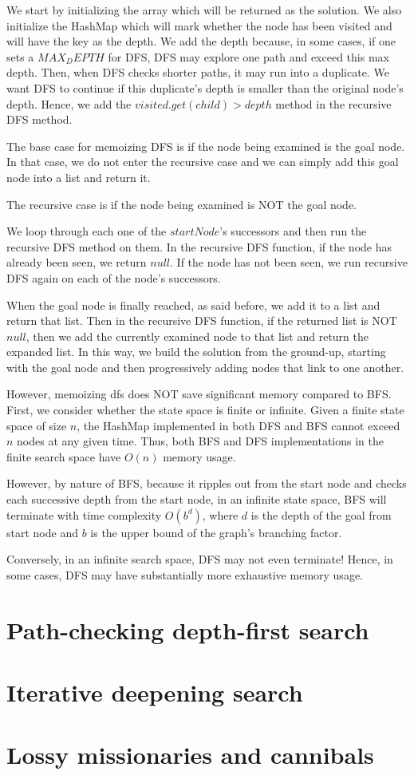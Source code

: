 \documentclass[a4paper]{report}
\begin{document}
We start by initializing the array which will be returned as the solution. We also initialize the HashMap which will
mark whether the node has been visited and will have the key as the depth. We add the depth because, in some cases, 
if one sets a $MAX_DEPTH$ for DFS, DFS may explore one path and exceed this max depth. Then, when DFS checks shorter
paths, it may run into a duplicate. We want DFS to continue if this duplicate's depth is smaller than the original node's
depth. Hence, we add the $visited.get(child) > depth$ method in the recursive DFS method.

The base case for memoizing DFS is if the node being examined is the goal node. In that case, we do not enter the recursive case and we can simply add this goal node into a list
and return it.

The recursive case is if the node being examined is NOT the goal node. 

We loop through each one of the $startNode$'s successors and then run the recursive DFS method on them. In the
recursive DFS function, if the node has already been seen, we return $null$. If the node has not been seen,
we run recursive DFS again on each of the node's successors.

When the goal node is finally reached, as said before, we add it to a list and return that list. Then in the
recursive DFS function, if the returned list is NOT $null$, then we add the currently examined node to that list
and return the expanded list. In this way, we build the solution from the ground-up, starting with the
goal node and then progressively adding nodes that link to one another.

However, memoizing dfs does NOT save significant memory compared to BFS. First, we consider whether the state space is finite or infinite. 
Given a finite state space of size $n$, the HashMap implemented in both DFS and BFS cannot exceed $n$ nodes at any given time. Thus,
both BFS and DFS implementations in the finite search space have $O(n)$ memory usage. 

However, by nature of BFS, because it ripples out from the
start node and checks each successive depth from the start node, in an infinite state space, BFS will terminate with time complexity $O(b^d)$, 
where $d$ is the depth of the goal from start node and $b$ is the upper bound of the graph's branching factor. 

Conversely, in an infinite search space, DFS may not even terminate! Hence, in some cases, DFS may have substantially more exhaustive
memory usage. 


\section{Path-checking depth-first search}

\section{Iterative deepening search}



\section{Lossy missionaries and cannibals}
\end{document}
